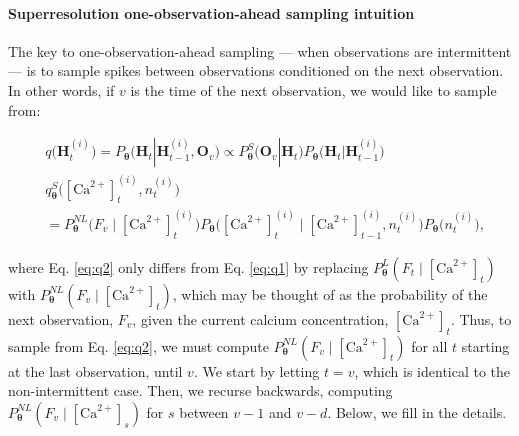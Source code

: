 \documentclass[10pt]{article}
\providecommand{\ve}[1]{\boldsymbol{#1}}
\providecommand{\ve}[1]{\boldsymbol{#1}}
\newcommand{\thetn}{\ve{\theta}}
\newcommand{\p}{P_{\thetn}}
\newcommand{\q}{q\big(\ve{H}_t^{(i)}\big)}
\newcommand{\Ca}{[\text{Ca}^{2+}]}
\begin{document}
\paragraph{Superresolution one-observation-ahead sampling intuition}

The key to one-observation-ahead sampling --- when observations are intermittent ---  is to sample spikes between observations conditioned on the next observation.  In other words, if $v$ is the time of the next observation, we would like to sample from:

\begin{align} \label{eq:q2}
&\q = \p\big(\ve{H}_t | \ve{H}_{t-1}^{(i)}, \ve{O}_v\big) %
\propto  \p^S\big(\ve{O}_v | \ve{H}_t\big) \p\big(\ve{H}_t | \ve{H}_{t-1}^{(i)}\big)\nonumber \\ 
&q_{\thetn}^{S}\big(\Ca_t^{(i)}, n_t^{(i)}\big) \nonumber\\
&=  \p^{NL}\big(F_v \mid \Ca_t^{(i)}\big)  \p\big(\Ca_t^{(i)} \mid \Ca_{t-1}^{(i)}, n_t^{(i)}\big) \p\big(n_t^{(i)}\big),
\end{align}

\noindent where Eq. \ref{eq:q2} only differs from Eq. \ref{eq:q1} by replacing $\p^L(F_t \mid \Ca_t)$ with $\p^{NL}(F_v \mid \Ca_t)$, which may be thought of as the probability of the next observation, $F_v$, given the current calcium concentration, $\Ca_t$.  Thus, to sample from Eq. \ref{eq:q2}, we must compute $\p^{NL}(F_v \mid \Ca_t)$ for all $t$ starting at the last observation, until $v$.  We start by letting $t=v$, which is identical to the non-intermittent case.  Then, we recurse backwards, computing $\p^{NL}(F_v \mid \Ca_s)$ for $s$ between $v-1$ and $v-d$. Below, we fill in the details.  
\end{document}
